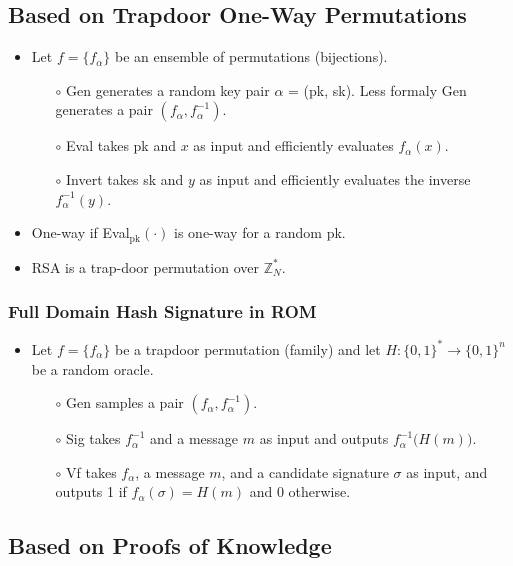 \documentclass[a4paper]{scrartcl}
\begin{document}
\subsection*{Based on Trapdoor One-Way Permutations}

\begin{itemize}
\item Let $f = \{f_\alpha\}$ be an ensemble of permutations (bijections).
\begin{itemize}
\item [$\circ$] Gen generates a random key pair $\alpha$ = (pk, sk). Less formaly Gen generates a pair $(f_\alpha,f_\alpha^{-1})$.
\item [$\circ$] Eval takes pk and $x$ as input and efficiently evaluates $f_\alpha(x)$.
\item [$\circ$] Invert takes sk and $y$ as input and efficiently evaluates the inverse $f_\alpha^{-1}(y)$.
\end{itemize}
\item One-way if Eval$_\text{pk}(\cdot)$ is one-way for a random pk.
\item RSA is a trap-door permutation over $\mathbb{Z}_N^*$.
\end{itemize}

\subsubsection*{Full Domain Hash Signature in ROM}

\begin{itemize}
\item Let $f = \{f_\alpha\}$ be a trapdoor permutation (family) and let $H: \{0,1\}^* \rightarrow \{0,1\}^n$ be a random oracle.
\begin{itemize}
\item [$\circ$] Gen samples a pair $(f_\alpha,f_\alpha^{-1})$.
\item [$\circ$] Sig takes $f_\alpha^{-1}$ and a message $m$ as input and outputs $f_\alpha^{-1}\big(H(m)\big)$.
\item [$\circ$] Vf takes $f_\alpha$, a message $m$, and a candidate signature $\sigma$ as input, and outputs 1 if $f_\alpha(\sigma) = H(m)$ and 0 otherwise.
\end{itemize}
\end{itemize}

\subsection*{Based on Proofs of Knowledge}
\end{document}
